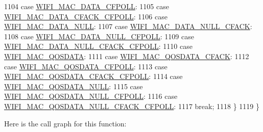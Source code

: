 \begin{DoxyCode}
1104     \textcolor{keywordflow}{case} \hyperlink{namespacens3_a9318472db39b35b2092de5c721e6ab0aab7872ae6681b4b39e265f6ab85d3e9ca}{WIFI\_MAC\_DATA\_CFPOLL}:
1105     \textcolor{keywordflow}{case} \hyperlink{namespacens3_a9318472db39b35b2092de5c721e6ab0aaafad3f2fa07671f676c0b60a6d3712b3}{WIFI\_MAC\_DATA\_CFACK\_CFPOLL}:
1106     \textcolor{keywordflow}{case} \hyperlink{namespacens3_a9318472db39b35b2092de5c721e6ab0aa276147ffa7d0998e81df2a93bc0e3916}{WIFI\_MAC\_DATA\_NULL}:
1107     \textcolor{keywordflow}{case} \hyperlink{namespacens3_a9318472db39b35b2092de5c721e6ab0aabc959e2ce5603c048b6df4c9eef31827}{WIFI\_MAC\_DATA\_NULL\_CFACK}:
1108     \textcolor{keywordflow}{case} \hyperlink{namespacens3_a9318472db39b35b2092de5c721e6ab0aadf0bf3167056a3aea0cab8e7aaf1f63f}{WIFI\_MAC\_DATA\_NULL\_CFPOLL}:
1109     \textcolor{keywordflow}{case} \hyperlink{namespacens3_a9318472db39b35b2092de5c721e6ab0aaa54cbe56295bf20231940217681f710c}{WIFI\_MAC\_DATA\_NULL\_CFACK\_CFPOLL}:
1110     \textcolor{keywordflow}{case} \hyperlink{namespacens3_a9318472db39b35b2092de5c721e6ab0aafd37aea1ac3edba5410fac6367b19b1d}{WIFI\_MAC\_QOSDATA}:
1111     \textcolor{keywordflow}{case} \hyperlink{namespacens3_a9318472db39b35b2092de5c721e6ab0aaa8964f524a1010f07f3931e247da98ce}{WIFI\_MAC\_QOSDATA\_CFACK}:
1112     \textcolor{keywordflow}{case} \hyperlink{namespacens3_a9318472db39b35b2092de5c721e6ab0aaeefc3d866dc68b40f8e0ec3b607b8eca}{WIFI\_MAC\_QOSDATA\_CFPOLL}:
1113     \textcolor{keywordflow}{case} \hyperlink{namespacens3_a9318472db39b35b2092de5c721e6ab0aa5ff1afbdb4cc26f37a45d1f20ef0847e}{WIFI\_MAC\_QOSDATA\_CFACK\_CFPOLL}:
1114     \textcolor{keywordflow}{case} \hyperlink{namespacens3_a9318472db39b35b2092de5c721e6ab0aad90e617c20db7fc43c15396faaafc750}{WIFI\_MAC\_QOSDATA\_NULL}:
1115     \textcolor{keywordflow}{case} \hyperlink{namespacens3_a9318472db39b35b2092de5c721e6ab0aa9c6fec4cd3cbb0f4aff769c127e33dd0}{WIFI\_MAC\_QOSDATA\_NULL\_CFPOLL}:
1116     \textcolor{keywordflow}{case} \hyperlink{namespacens3_a9318472db39b35b2092de5c721e6ab0aa04e52cad72b938a1d1ac221151e4c198}{WIFI\_MAC\_QOSDATA\_NULL\_CFACK\_CFPOLL}:
1117       \textcolor{keywordflow}{break};
1118     \}
1119 \}
\end{DoxyCode}


Here is the call graph for this function\+:


